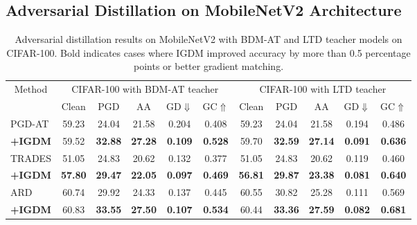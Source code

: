 \documentclass{article} %
\begin{document}
\subsection{Adversarial Distillation on MobileNetV2 Architecture}
\label{sec:mobilenet}
\begin{table}[h]
 \centering
 \caption{Adversarial distillation results on MobileNetV2 with BDM-AT and LTD teacher models on CIFAR-100. Bold indicates cases where IGDM improved accuracy by more than 0.5 percentage points or better gradient matching.}
 \setlength{\tabcolsep}{6pt}
 \begin{tabular}{lcccccccccc}
 \toprule
    \multicolumn{1}{c}{\multirow{2.5}{*}{Method}}  & \multicolumn{5}{c}{ CIFAR-100 with BDM-AT teacher}& \multicolumn{5}{c}{CIFAR-100 with LTD teacher} \\
   \cmidrule(r){2-6}
   \cmidrule(r){7-11}
   & Clean & PGD & AA & GD$\Downarrow$ & GC$\Uparrow$ & Clean & PGD & AA & GD$\Downarrow$ & GC$\Uparrow$ \\
\midrule

 PGD-AT  & 59.23 & 24.04 & 21.58 & 0.204 & 0.408 
& 59.23 & 24.04 & 21.58 & 0.194 & 0.486 
\\
 \textbf{+IGDM} & 59.52 & \textbf{32.88} & \textbf{27.28} & \textbf{0.109} & \textbf{0.528} 
& 59.70 & \textbf{32.59} & \textbf{27.14} & \textbf{0.091} & \textbf{0.636} 
\\
 \midrule
 TRADES & 51.05 & 24.83 & 20.62 & 0.132 & 0.377 
& 51.05 & 24.83 & 20.62 & 0.119 & 0.460 
\\
 \textbf{+IGDM}  & \textbf{57.80} & \textbf{29.47} & \textbf{22.05} & \textbf{0.097} & \textbf{0.469} 
& \textbf{56.81} & \textbf{29.87} & \textbf{23.38} & \textbf{0.081} & \textbf{0.640} 
\\
 \midrule
 ARD & 60.74 & 29.92 & 24.33 & 0.137 & 0.445  
& 60.55 & 30.82 & 25.28 & 0.111 & 0.569 
\\
 \textbf{+IGDM} & 60.83 & \textbf{33.55} & \textbf{27.50} & \textbf{0.107} & \textbf{0.534}  
& 60.44 & \textbf{33.36} & \textbf{27.59} & \textbf{0.082} & \textbf{0.681} 
\\
 \midrule


\end{tabular}
\end{table}
\end{document}
